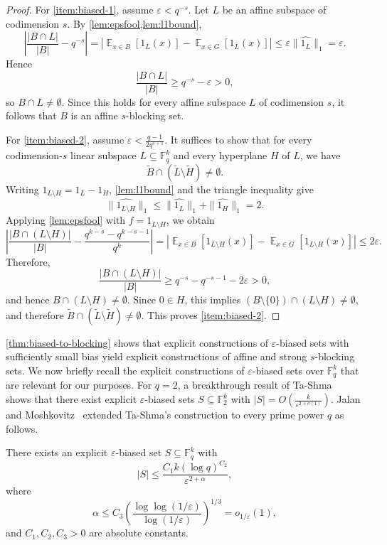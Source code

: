 \documentclass[11pt]{article}
\newcommand{\eps}{\varepsilon}
\newcommand{\ex}{\mathop{{}\mathbb{E}}}
\newcommand{\F}{\mathbb{F}}
\begin{document}
\begin{proof}
For \cref{item:biased-1}, assume $\eps<q^{-s}$. Let $L$ be an affine subspace of codimension $s$. By \cref{lem:epsfool,lem:l1bound},
\[
\left|\frac{|B\cap L|}{|B|}-q^{-s}\right|
=
\left|\ex_{x\in B}[1_L(x)]-\ex_{x\in G}[1_L(x)]\right|
\le \eps\|\widehat{1_L}\|_1
=\eps.
\]
Hence
\[
\frac{|B\cap L|}{|B|}\ge q^{-s}-\eps>0,
\]
so $B\cap L\neq\emptyset$. Since this holds for every affine subspace $L$ of codimension $s$, it follows that $B$ is an affine $s$-blocking set.

For \cref{item:biased-2}, assume $\eps<\frac{q-1}{2q^{s+1}}$. It suffices to show that for every codimension-$s$ linear subspace $L\subseteq \F_q^k$ and every hyperplane $H$ of $L$, we have
\[
\widetilde{B}\cap(\widetilde{L}\setminus \widetilde{H})\neq\emptyset.
\]
Writing $1_{L\setminus H}=1_L-1_H$, \cref{lem:l1bound} and the triangle inequality give
\[
\|\widehat{1_{L\setminus H}}\|_1\le \|\widehat{1_L}\|_1+\|\widehat{1_H}\|_1=2.
\]
Applying \cref{lem:epsfool} with $f=1_{L\setminus H}$, we obtain
\[
\left|\frac{|B\cap (L\setminus H)|}{|B|} - \frac{q^{k-s}-q^{k-s-1}}{q^k}\right|
=
\left|\ex_{x\in B}[1_{L\setminus H}(x)]-\ex_{x\in G}[1_{L\setminus H}(x)]\right|
\le 2\eps.
\]
Therefore,
\[
\frac{|B\cap (L\setminus H)|}{|B|}\ge q^{-s}-q^{-s-1}-2\eps>0,
\]
and hence $B\cap (L\setminus H)\neq\emptyset$. Since $0\in H$, this implies $(B\setminus\{0\})\cap (L\setminus H)\neq\emptyset$,
and therefore
$\widetilde{B}\cap(\widetilde{L}\setminus \widetilde{H})\neq\emptyset$.
This proves \cref{item:biased-2}.
\end{proof}

\cref{thm:biased-to-blocking} shows that explicit constructions of $\eps$-biased sets with sufficiently small bias yield explicit constructions of affine and strong $s$-blocking sets. We now briefly recall the explicit constructions of $\eps$-biased sets over $\mathbb{F}_q^k$ that are relevant for our purposes. For $q=2$, a breakthrough result of Ta-Shma~\cite{Ta17} shows that there exist explicit $\eps$-biased sets $S\subseteq\mathbb{F}_2^k$ with
$|S|=O\left(\frac{k}{\eps^{2+o(1)}}\right)$.
Jalan and Moshkovitz~\cite{JM21} extended Ta-Shma's construction to every prime power $q$ as follows.

\begin{theorem}[{\cite{JM21}}]\label{thm:explicit-eps}
There exists an explicit $\eps$-biased set $S\subseteq\mathbb{F}_q^k$ with
\[
|S|\le \frac{C_1 k (\log q)^{C_2}}{\eps^{2+\alpha}},
\]
where
\[
\alpha\le C_3\left(\frac{\log\log(1/\eps)}{\log(1/\eps)}\right)^{1/3}=o_{1/\eps}(1),
\]
and $C_1,C_2,C_3>0$ are absolute constants.
\end{theorem}
\end{document}
